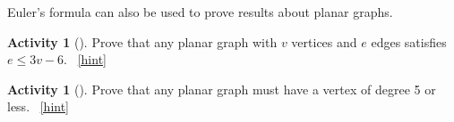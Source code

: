 \documentclass[10pt,]{book}
\theoremstyle{plain}
\theoremstyle{definition}
\theoremstyle{definition}
\theoremstyle{definition}
\newtheorem{activity}[project]{Activity}
\numberwithin{equation}{chapter}
\begin{document}
\par
\hypertarget{p-293}{}%
Euler's formula can also be used to prove results about planar graphs.%
\begin{activity}[]\label{activity-25}
\hypertarget{p-294}{}%
Prove that any planar graph with \(v\) vertices and \(e\) edges satisfies \(e \le 3v - 6\).%
~\hfill{\tiny\hyperlink{a-30}{[hint]}\hypertarget{q-30}{}}\end{activity}
\begin{activity}[]\label{act-planardeg5}
\hypertarget{p-297}{}%
Prove that any planar graph must have a vertex of degree 5 or less.%
~\hfill{\tiny\hyperlink{a-31}{[hint]}\hypertarget{q-31}{}}\end{activity}
\typeout{************************************************}
\typeout{************************************************}
\end{document}
